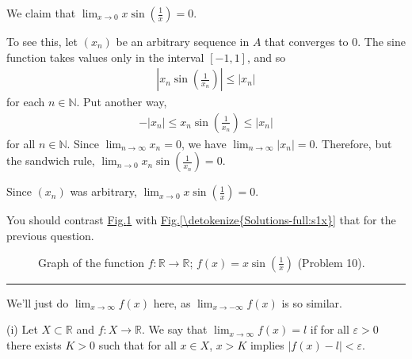 \documentclass[letterpaper,10pt,english]{jupyterBook}
\let\sphinxpxdimen\pdfpxdimen\else\newdimen\sphinxpxdimen
\begin{document}
We claim that \(\displaystyle\lim_{x \rightarrow 0} x \sin\left(\frac{1}{x}\right) = 0\).

To see this, let \((x_{n})\) be an arbitrary sequence in \(A\) that converges to \(0\). The sine function takes values only in the interval \([-1,1]\), and so
\begin{equation*}
\begin{split}
\left|x_n\sin\left(\frac{1}{x_n}\right)\right| \leq |x_n|
\end{split}
\end{equation*}
\sphinxAtStartPar
for each \(n\in\mathbb{N}\). Put another way,
\begin{equation*}
\begin{split}
-|x_{n}| \leq x_{n}\sin\left(\frac{1}{x_n}\right) \leq |x_{n}|
\end{split}
\end{equation*}
\sphinxAtStartPar
for all \(n\in\mathbb{N}\). Since \(\displaystyle\lim_{n\to \infty} x_n=0\), we have \( \displaystyle\lim_{n\to \infty} |x_n| =0\). Therefore, but the sandwich rule, \(\displaystyle\lim_{n\rightarrow 0}x_n\sin\left(\frac{1}{x_n}\right) = 0\).

Since \((x_n)\) was arbitrary, \(\displaystyle\lim_{x \rightarrow 0} x \sin\left(\frac{1}{x}\right) = 0\).

You should contrast \hyperref[\detokenize{Solutions-full:xs1x}]{Fig.\@ \ref{\detokenize{Solutions-full:xs1x}}} with \hyperref[\detokenize{Solutions-full:s1x}]{Fig.\@ \ref{\detokenize{Solutions-full:s1x}}} that for the previous question.

\begin{figure}[htbp]
\centering
\capstart

\noindent\sphinxincludegraphics[width=700\sphinxpxdimen]{{xsin(1,x)}.png}
\caption{Graph of the function \(f:\mathbb{R}\to\mathbb{R}\); \(f(x)=x\sin\left(\frac{1}{x}\right)\) (Problem 10).}\label{\detokenize{Solutions-full:xs1x}}\end{figure}


\bigskip\hrule\bigskip


\sphinxAtStartPar
{\hyperref[\detokenize{Problems:id11}]{}} We’ll just do \(\displaystyle\lim_{x \rightarrow \infty}f(x)\) here, as \(\displaystyle\lim_{x \rightarrow -\infty}f(x)\) is so similar.

\sphinxAtStartPar
(i) Let \(X\subset\mathbb{R}\) and \(f:X\to\mathbb{R}\). We say that \(\lim_{x \rightarrow \infty}f(x) = l\) if for all \(\varepsilon>0\) there exists \(K>0\) such that for all \(x\in X\), \(x>K\) implies \(|f(x)-l|<\varepsilon\).
\end{document}
